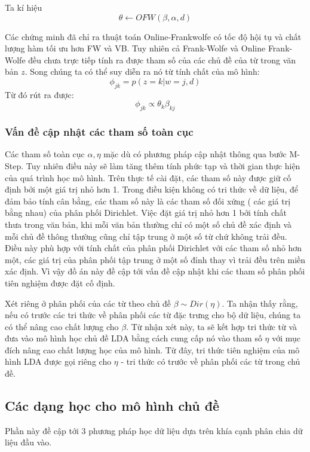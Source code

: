 \documentclass[fontsize=13pt]{scrartcl}
\begin{document}
Ta kí hiệu 
\begin{equation}
\theta \leftarrow OFW(\beta,\alpha,d)
\end{equation}

Các chứng minh đã chỉ ra thuật toán Online-Frankwolfe có tốc độ hội tụ và chất lượng hàm tối ưu hơn FW và VB. Tuy nhiên cả Frank-Wolfe và Online Frank-Wolfe đều chưa trực tiếp tính ra được tham số của các chủ đề của từ trong văn bản $z$. Song chúng ta có thể suy diễn ra nó từ tính chất của mô hình:
\begin{equation}
\phi_{jk} = p(z = k | w = j, d)
\end{equation}
Từ đó rút ra được:
\begin{equation}
\phi_{jk} \propto \theta_{k}\beta_{kj}
\end{equation}

\subsubsection{Vấn đề cập nhật các tham số toàn cục}
Các tham số toàn cục $\alpha,\eta$ mặc dù có phương pháp cập nhật thông qua bước M-Step. Tuy nhiên điều này sẽ làm tăng thêm tính phức tạp và thời gian thực hiện của quá trình học mô hình. Trên thực tế cài đặt, các tham số này được giữ cố định bởi một giá trị nhỏ hơn 1. Trong điều kiện không có tri thức về dữ liệu, để đảm bảo tính cân bằng, các tham số này là các tham số đối xứng ( các giá trị bằng nhau) của phân phối Dirichlet. Việc đặt giá trị nhỏ hơn 1 bởi tính chất thưa trong văn bản, khi mỗi văn bản thường chỉ có một số chủ đề xác định và mỗi chủ đề thông thường cũng chỉ tập trung ở một số từ chứ không trải đều. Điều này phù hợp với tính chất của phân phối Dirichlet với các tham số nhỏ hơn một, các giá trị của phân phối tập trung ở một số đỉnh thay vì trải đều trên miền xác định. Vì vậy đồ án này đề cập tới vấn đề cập nhật khi các tham số phân phối tiên nghiệm được đặt cố định.
\par
Xét riêng ở phân phối của các từ theo chủ đề $\beta \sim Dir(\eta)$. Ta nhận thấy rằng, nếu có trước các tri thức về phân phối các từ đặc trưng cho bộ dữ liệu, chúng ta có thể nâng cao chất lượng cho $\beta$.  Từ nhận xét này, ta sẽ kết hợp tri thức từ và đưa vào mô hình học chủ đề LDA bằng cách cung cấp nó vào tham số $\eta$ với mục đích nâng cao chất lượng học của mô hình. Từ đây,  tri thức tiên nghiệm của mô hình LDA được gọi riêng cho $\eta$ - tri thức có trước về phân phối các từ trong chủ đề.  
\subsection{Các dạng học cho mô hình chủ đề}
Phần này đề cập tới 3 phương pháp học dữ liệu dựa trên khía cạnh phân chia dữ liệu đầu vào.
\end{document}
